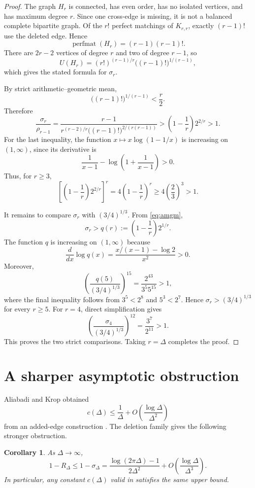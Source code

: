\documentclass[11pt]{amsart}
\newtheorem{corollary}[theorem]{Corollary}
\theoremstyle{remark}
\newcommand{\perfmat}{\operatorname{perfmat}}
\begin{document}
\begin{proof}
The graph $H_r$ is connected, has even order, has no isolated vertices, and has
maximum degree $r$. Since one cross-edge is missing, it is not a balanced
complete bipartite graph. Of the $r!$ perfect matchings of $K_{r,r}$,
exactly $(r-1)!$ use the deleted edge. Hence
\[
\perfmat(H_r)=(r-1)(r-1)!.
\]
There are $2r-2$ vertices of degree $r$ and two of degree $r-1$, so
\[
U(H_r)=(r!)^{(r-1)/r}\bigl((r-1)!\bigr)^{1/(r-1)},
\]
which gives the stated formula for $\sigma_r$.

By strict arithmetic--geometric mean,
\begin{equation}\label{eq:amgm}
\bigl((r-1)!\bigr)^{1/(r-1)}<\frac r2.
\end{equation}
Therefore
\[
\frac{\sigma_r}{\rho_{r-1}}
=
\frac{r-1}
{r^{(r-2)/r}\bigl((r-1)!\bigr)^{2/(r(r-1))}}
>
\left(1-\frac1r\right)2^{2/r}>1.
\]
For the last inequality, the function
$x\mapsto x\log(1-1/x)$ is increasing on $(1,\infty)$, since its derivative
is
\[
\frac1{x-1}-\log\left(1+\frac1{x-1}\right)>0.
\]
Thus, for $r\ge3$,
\[
\left[\left(1-\frac1r\right)2^{2/r}\right]^r
=4\left(1-\frac1r\right)^r
\ge4\left(\frac23\right)^3>1.
\]

It remains to compare $\sigma_r$ with $(3/4)^{1/3}$. From
\eqref{eq:amgm},
\[
\sigma_r>
q(r):=\left(1-\frac1r\right)2^{1/r}.
\]
The function $q$ is increasing on $(1,\infty)$ because
\[
\frac{d}{dx}\log q(x)
=
\frac{x/(x-1)-\log2}{x^2}>0.
\]
Moreover,
\[
\left(\frac{q(5)}{(3/4)^{1/3}}\right)^{15}
=
\frac{2^{43}}{3^5 5^{15}}>1,
\]
where the final inequality follows from $3^5<2^8$ and $5^3<2^7$.
Hence $\sigma_r>(3/4)^{1/3}$ for every $r\ge5$. For $r=4$, direct
simplification gives
\[
\left(\frac{\sigma_4}{(3/4)^{1/3}}\right)^{12}
=
\frac{3^7}{2^{11}}>1.
\]
This proves the two strict comparisons. Taking $r=\Delta$ completes the
proof.
\end{proof}

\section{A sharper asymptotic obstruction}

Aliabadi and Krop obtained
\[
c(\Delta)\le \frac1\Delta+O\left(\frac{\log\Delta}{\Delta^2}\right)
\]
from an added-edge construction \cite[Corollary~4.8]{AliabadiKrop}.
The deletion family gives the following stronger obstruction.

\begin{corollary}\label{cor:gap}
As $\Delta\to\infty$,
\[
1-R_\Delta
\le 1-\sigma_\Delta
=
\frac{\log(2\pi\Delta)-1}{2\Delta^2}
+O\left(\frac{\log\Delta}{\Delta^3}\right).
\]
In particular, any constant $c(\Delta)$ valid in
\cite[Problem~4.4]{AliabadiKrop} satisfies the same upper bound.
\end{corollary}
\end{document}
